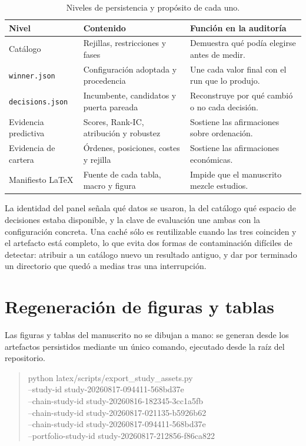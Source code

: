 \begin{table}[htbp]
  \centering
  \small
  \begin{tabularx}{\textwidth}{p{3.1cm}X X}
    \toprule
    Nivel & Contenido & Función en la auditoría \\
    \midrule
    Catálogo & Rejillas, restricciones y fases & Demuestra qué podía elegirse antes de medir. \\
    \texttt{winner.json} & Configuración adoptada y procedencia & Une cada valor final con el run que lo produjo. \\
    \texttt{decisions.json} & Incumbente, candidatos y puerta pareada & Reconstruye por qué cambió o no cada decisión. \\
    Evidencia predictiva & Scores, Rank-IC, atribución y robustez & Sostiene las afirmaciones sobre ordenación. \\
    Evidencia de cartera & Órdenes, posiciones, costes y rejilla & Sostiene las afirmaciones económicas. \\
    Manifiesto LaTeX & Fuente de cada tabla, macro y figura & Impide que el manuscrito mezcle estudios. \\
    \bottomrule
  \end{tabularx}
  \caption{Niveles de persistencia y propósito de cada uno.}
  \label{tab:cadena-custodia}
\end{table}

La identidad del panel señala qué datos se usaron, la del catálogo qué espacio de decisiones estaba
disponible, y la clave de evaluación une ambas con la configuración concreta. Una caché sólo es
reutilizable cuando las tres coinciden y el artefacto está completo, lo que evita dos formas de
contaminación difíciles de detectar: atribuir a un catálogo nuevo un resultado antiguo, y dar por
terminado un directorio que quedó a medias tras una interrupción.

\section{Regeneración de figuras y tablas}

Las figuras y tablas del manuscrito no se dibujan a mano: se generan desde los artefactos
persistidos mediante un único comando, ejecutado desde la raíz del repositorio.

\begin{quote}
\ttfamily
python latex/scripts/export\_study\_assets.py \\
\hspace*{2em}--study-id study-20260817-094411-568bd37e \\
\hspace*{2em}--chain-study-id study-20260816-182345-3cc1a5fb \\
\hspace*{2em}--chain-study-id study-20260817-021135-b5926b62 \\
\hspace*{2em}--chain-study-id study-20260817-094411-568bd37e \\
\hspace*{2em}--portfolio-study-id study-20260817-212856-f86ca822
\end{quote}

